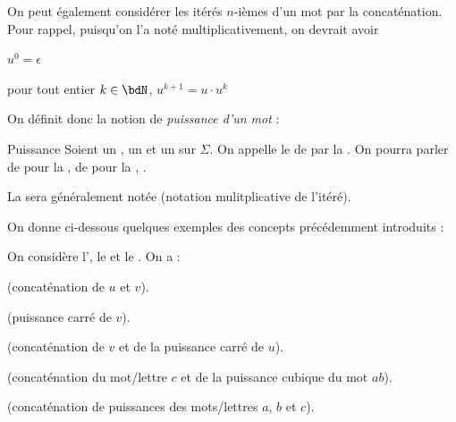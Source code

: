     On peut également considérer les itérés $n$-ièmes d'un mot par la concaténation. Pour rappel, puisqu'on l'a noté multiplicativement, on devrait
    avoir
    \begin{enumerate}
        \itt $u^0 = \epsilon$
        
        \itt pour tout entier $k \in \bdN$, $u^{k+1} = u \cdot u^k$
    \end{enumerate}
    On définit donc la notion de \emph{puissance d'un mot} :
    
    \begin{definition}{Puissance}{}
        Soient \hg{$\Sigma$} un ,  un  et  un  sur $\Sigma$. On appelle
         le  de  par la . On pourra parler de  pour
        la , de  pour la , \etc\!\!.
    \end{definition}
    \begin{notation}
        La  sera généralement notée 
        (notation mulitplicative de l'itéré).
    \end{notation}
    
    On donne ci-dessous quelques exemples des concepts précédemment introduits :
    
    \begin{example}{}{}
        On considère l', le  et le . On
        a :
        \begin{enumerate}
            \itt {} (concaténation de $u$ et $v$).
            
            \itt {} (puissance carré de $v$).
            
            \itt {} (concaténation de $v$ et de la puissance carré de $u$).
            
            \itt {} (concaténation du mot/lettre $c$ et de la puissance cubique du mot
            $ab$).
            
            \itt {} (concaténation de puissances des mots/lettres $a$, $b$ et $c$).
        \end{enumerate}
    \end{example}
    
